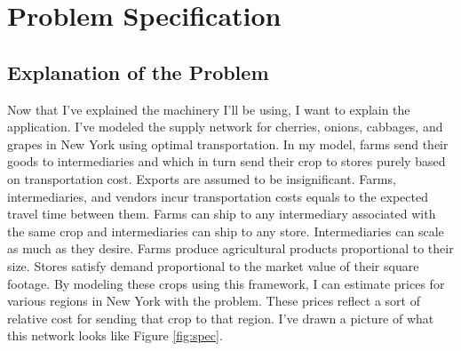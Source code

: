 \documentclass{report}
\begin{document}
\chapter{Problem Specification}

\section{Explanation of the Problem}

Now that I've explained the machinery I'll be using, I want to explain the application. I've modeled the supply network for cherries, onions, cabbages, and grapes in New York using optimal transportation.  In my model, farms send their goods to intermediaries and which in turn send their crop to stores purely based on transportation cost. Exports are assumed to be insignificant. Farms, intermediaries, and vendors incur transportation costs equals to the expected travel time between them. Farms can ship to any intermediary associated with the same crop and intermediaries can ship to any store. Intermediaries can scale as much as they desire. Farms produce agricultural products proportional to their size. Stores satisfy demand proportional to the market value of their square footage. By modeling these crops using this framework, I can estimate prices for various regions in New York with the problem. These prices reflect a sort of relative cost for sending that crop to that region. I've drawn a picture of what this network looks like Figure \ref{fig:spec}.
\end{document}
